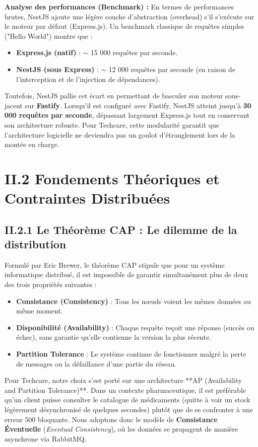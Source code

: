 \textbf{Analyse des performances (Benchmark) :}
En termes de performances brutes, NestJS ajoute une légère couche d'abstraction (overhead) s'il s'exécute sur le moteur par défaut (Express.js). Un benchmark classique de requêtes simples ("Hello World") montre que :
\begin{itemize}
    \item \textbf{Express.js (natif)} : \(\sim\) 15 000 requêtes par seconde.
    \item \textbf{NestJS (sous Express)} : \(\sim\) 12 000 requêtes par seconde (en raison de l'interception et de l'injection de dépendances).
\end{itemize}
Toutefois, NestJS pallie cet écart en permettant de basculer son moteur sous-jacent sur \textbf{Fastify}. Lorsqu'il est configuré avec Fastify, NestJS atteint jusqu'à \textbf{30 000 requêtes par seconde}, dépassant largement Express.js tout en conservant son architecture robuste. Pour Techcare, cette modularité garantit que l'architecture logicielle ne deviendra pas un goulot d'étranglement lors de la montée en charge.

\section{II.2 Fondements Théoriques et Contraintes Distribuées}
\label{sec:theorie}

\subsection{II.2.1 Le Théorème CAP : Le dilemme de la distribution}
Formulé par Eric Brewer, le théorème CAP stipule que pour un système informatique distribué, il est impossible de garantir simultanément plus de deux des trois propriétés suivantes :
\begin{itemize}
    \item \textbf{Consistance (Consistency)} : Tous les nœuds voient les mêmes données au même moment.
    \item \textbf{Disponibilité (Availability)} : Chaque requête reçoit une réponse (succès ou échec), sans garantie qu'elle contienne la version la plus récente.
    \item \textbf{Partition Tolerance} : Le système continue de fonctionner malgré la perte de messages ou la défaillance d'une partie du réseau.
\end{itemize}

Pour Techcare, notre choix s'est porté sur une architecture **AP (Availability and Partition Tolerance)**. Dans un contexte pharmaceutique, il est préférable qu'un client puisse consulter le catalogue de médicaments (quitte à voir un stock légèrement désynchronisé de quelques secondes) plutôt que de se confronter à une erreur 500 bloquante. Nous adoptons donc le modèle de \textbf{Consistance Éventuelle} (\textit{Eventual Consistency}), où les données se propagent de manière asynchrone via RabbitMQ.

